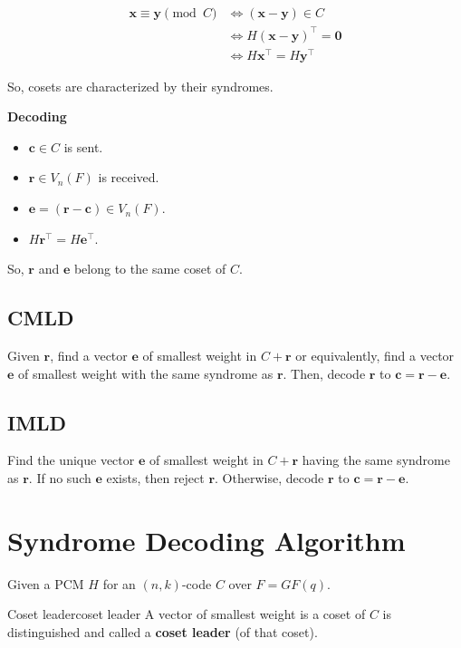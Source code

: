 \begin{Proof}{}{}
    \begin{align*}
        \symbf{x}\equiv \symbf{y}\pmod{C}
         & \iff (\symbf{x}-\symbf{y})\in C            \\
         & \iff H(\symbf{x}-\symbf{y})^\top=\symbf{0} \\
         & \iff H\symbf{x}^\top=H\symbf{y}^\top
    \end{align*}
\end{Proof}
So, cosets are characterized by their syndromes.

\textbf{Decoding}
\begin{itemize}
    \item $ \symbf{c}\in C $ is sent.
    \item $ \symbf{r}\in V_n(F) $ is received.
    \item $ \symbf{e}=(\symbf{r}-\symbf{c})\in V_n(F) $.
    \item $ H\symbf{r}^\top=H\symbf{e}^\top $.
\end{itemize}
So, $ \symbf{r} $ and $ \symbf{e} $ belong to the same coset of $ C $.

\subsection*{CMLD}
Given $ \symbf{r} $, find a vector $ \symbf{e} $ of smallest weight in $ C+\symbf{r} $
or equivalently, find a vector $ \symbf{e} $ of smallest weight with the same
syndrome as $ \symbf{r} $. Then, decode $ \symbf{r} $ to $ \symbf{c}=\symbf{r}-\symbf{e} $.

\subsection*{IMLD}
Find the unique vector $ \symbf{e} $ of smallest weight in $ C+\symbf{r} $
having the same syndrome as $ \symbf{r} $.
If no such $ \symbf{e} $ exists, then reject $ \symbf{r} $.
Otherwise, decode $ \symbf{r} $ to $ \symbf{c}=\symbf{r}-\symbf{e} $.

\section{Syndrome Decoding Algorithm}
Given a PCM $ H $ for an $ (n,k) $-code $ C $ over $ F=GF(q) $.

\begin{Definition}{Coset leader}{coset leader}
    A vector of smallest weight is a coset of $ C $ is distinguished and called
    a \textbf{coset leader} (of that coset).
\end{Definition}

